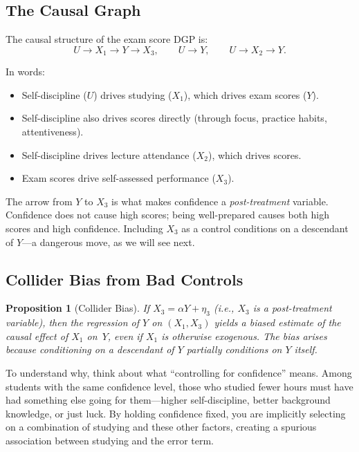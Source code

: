 \documentclass[11pt,a4paper]{article}
\theoremstyle{definition}
\theoremstyle{plain}
\newtheorem{proposition}{Proposition}[section]
\theoremstyle{remark}
\begin{document}
\subsection{The Causal Graph}

The causal structure of the exam score DGP is:
\[
  U \longrightarrow X_1 \longrightarrow Y \longrightarrow X_3, \qquad U \longrightarrow Y, \qquad U \longrightarrow X_2 \longrightarrow Y.
\]

In words:
\begin{itemize}[nosep]
  \item Self-discipline ($U$) drives studying ($X_1$), which drives exam scores ($Y$).
  \item Self-discipline also drives scores directly (through focus, practice habits, attentiveness).
  \item Self-discipline drives lecture attendance ($X_2$), which drives scores.
  \item Exam scores drive self-assessed performance ($X_3$).
\end{itemize}

The arrow from $Y$ to $X_3$ is what makes confidence a \emph{post-treatment} variable. Confidence does not cause high scores; being well-prepared causes both high scores and high confidence. Including $X_3$ as a control conditions on a descendant of $Y$---a dangerous move, as we will see next.

\subsection{Collider Bias from Bad Controls}

\begin{proposition}[Collider Bias]
If $X_3 = \alpha Y + \eta_3$ (i.e., $X_3$ is a post-treatment variable), then the regression of $Y$ on $(X_1, X_3)$ yields a biased estimate of the causal effect of $X_1$ on~$Y$, even if $X_1$ is otherwise exogenous.
The bias arises because conditioning on a descendant of $Y$ partially conditions on $Y$ itself.
\end{proposition}

To understand why, think about what ``controlling for confidence'' means. Among students with the same confidence level, those who studied fewer hours must have had something else going for them---higher self-discipline, better background knowledge, or just luck. By holding confidence fixed, you are implicitly selecting on a combination of studying and these other factors, creating a spurious association between studying and the error term.
\end{document}
